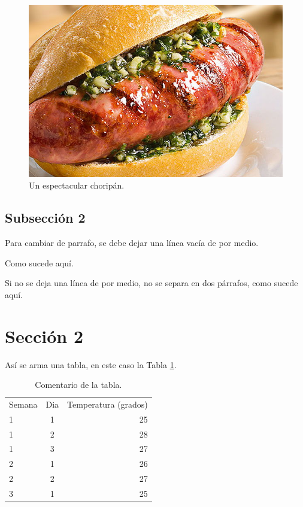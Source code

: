 \documentclass[12pt]{article}
\begin{document}
\begin{figure}
    \centering  %
    \includegraphics[width=0.4\linewidth]{img/choripan.jpg}  %
    \caption{Un espectacular choripán.}    %
    \label{fig:choripan}  %
\end{figure}

\subsection{Subsección 2}
Para cambiar de parrafo, se debe dejar una línea vacía de por medio.

Como sucede aquí.

Si no se deja una línea de por medio,
no se separa en dos párrafos,
como sucede aquí.

\section{Sección 2}

Así se arma una tabla, en este caso la Tabla \ref{tab:temperatura}.

\begin{table}[h!]
  \begin{center}
    \caption{Comentario de la tabla.}
    \label{tab:temperatura}  %
    \begin{tabular}{l c|r} %
      Semana & Dia & Temperatura (grados)\\ %
      1 & 1 & 25 \\ 
      1 & 2 & 28 \\ 
      1 & 3 & 27 \\ 
      \hline        %
      2 & 1 & 26 \\ 
      2 & 2 & 27 \\ 
      \hline
      3 & 1 & 25 \\ 
    \end{tabular}
  \end{center}
\end{table}
\end{document}
